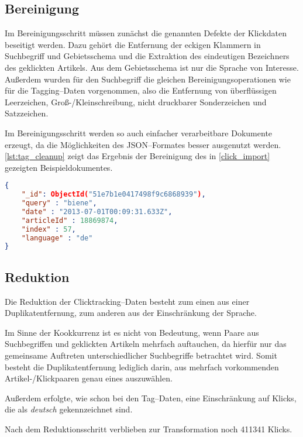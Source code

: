 \subsection{Bereinigung}

Im Bereinigungsschritt müssen zunächst die genannten Defekte der Klickdaten beseitigt werden. Dazu gehört die Entfernung der eckigen Klammern in Suchbegriff und Gebietsschema und die Extraktion des eindeutigen Bezeichners des geklickten Artikels. Aus dem Gebietsschema ist nur die Sprache von Interesse. Außerdem wurden für den Suchbegriff die gleichen Bereinigungsoperationen wie für die Tagging--Daten vorgenommen, also die Entfernung von überflüssigen Leerzeichen, Groß-/Kleinschreibung, nicht druckbarer Sonderzeichen und Satzzeichen.

Im Bereinigungsschritt werden so auch einfacher verarbeitbare Dokumente erzeugt, da die Möglichkeiten des JSON--Formates besser ausgenutzt werden. \cref{lst:tag_cleanup} zeigt das Ergebnis der Bereinigung des in \cref{click_import} gezeigten Beispieldokumentes.

\begin{lstlisting}[language=json, label={lst:tag_cleanup}, caption={Bereinigtes Clicktracking--Dokument}]
{
    "_id": ObjectId("51e7b1e0417498f9c6868939"),
    "query" : "biene",
    "date" : "2013-07-01T00:09:31.633Z",
    "articleId" : 18869874,
    "index" : 57,
    "language" : "de"
}
\end{lstlisting}

\subsection{Reduktion}

Die Reduktion der Clicktracking--Daten besteht zum einen aus einer Duplikatentfernung, zum anderen aus der Einschränkung der Sprache.

Im Sinne der Kookkurrenz ist es nicht von Bedeutung, wenn Paare aus Suchbegriffen und geklickten Artikeln mehrfach auftauchen, da hierfür nur das gemeinsame Auftreten unterschiedlicher Suchbegriffe betrachtet wird. Somit besteht die Duplikatentfernung lediglich darin, aus mehrfach vorkommenden Artikel-/Klickpaaren genau eines auszuwählen.

Außerdem erfolgte, wie schon bei den Tag--Daten, eine Einschränkung auf Klicks, die als \emph{deutsch} gekennzeichnet sind.

Nach dem Reduktionsschritt verblieben zur Transformation noch \num{411341} Klicks.

